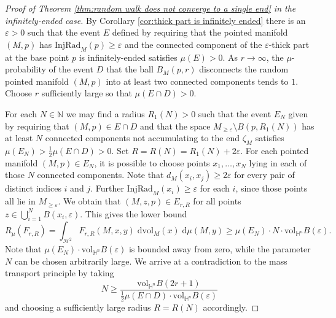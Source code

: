 \documentclass[10pt,a4paper]{amsart}
\newcommand{\HH}{\mathbb{H}}
\newcommand{\Hypers}{\mathcal{H}}
\newcommand{\NN}{\mathbb{N}}
\begin{document}
\begin{proof}[Proof of Theorem \ref{thm:random walk does not converge to a single end} in the infinitely-ended case]
By Corollary \ref{cor:thick part is infinitely ended} there is an  $\varepsilon  >0$ such that the event $E$ defined by requiring that the pointed manifold $(M,p)$ has  $\mathrm{InjRad}_M(p) \ge \varepsilon$ and the connected component of the $\varepsilon$-thick part at the base point $p$ is infinitely-ended satisfies $\mu(E)>0$. 
As $r\to \infty$, the $\mu$-probability of the event $D$ that the ball $B_M(p,r)$ disconnects the random pointed manifold $(M,p)$ into at least two connected components tends to $1$.
Choose $r$ sufficiently large so that  $\mu(E\cap D) > 0$.

For each $N \in \NN$ we may find a radius $R_1(N) > 0$ such that the event $E_N$ given by requiring that $(M,p) \in E\cap D$ and that the space $M_{\ge \varepsilon} \setminus B(p,R_1(N))$ has at least $N$  connected components not accumulating to the end $\zeta_M$ satisfies $\mu(E_N) > \frac{1}{2}\mu(E\cap D)>0$.
Set $R = 
R(N) = R_1(N) + 2\varepsilon$. For each pointed manifold $(M,p) \in E_N$, it is possible to choose points $x_1,\ldots,x_N$ lying in each of those $N$ connected components. Note that $d_M(x_i,x_j) \ge 2\varepsilon$ for every  pair of distinct indices $i$ and $j$. Further $\mathrm{InjRad}_M(x_i) \ge \varepsilon$ for each $i$, since those points all lie in $M_{\ge \varepsilon}$. We obtain that $(M,z,p) \in E_{r,R}$ for all points $z \in \bigcup_{i=1}^N B(x_i,\varepsilon)$. This gives  the lower bound
$$ R_\mu(F_{r,R}) = \int_{\Hypers^2} F_{r,R}(M,x,y) \; \mathrm{dvol}_M(x) \; \mathrm{d}\mu(M,y)  \ge \mu(E_N)\cdot N \cdot \mathrm{vol}_{\HH^n} B(\varepsilon).$$
Note that $\mu(E_N) \cdot \mathrm{vol}_{\HH^n} B(\varepsilon)$ is bounded away from zero, while the parameter $N$ can be chosen arbitrarily large. We arrive at a contradiction to the mass transport principle by taking
 $$N \ge \frac{\mathrm{vol}_{\HH^n} B(2r+1)}{
 \tfrac12\mu(E\cap D) \cdot \mathrm{vol}_{\HH^n} B(\varepsilon)}$$
and choosing a sufficiently large radius $R = R(N)$ accordingly.
\end{proof}
\end{document}
